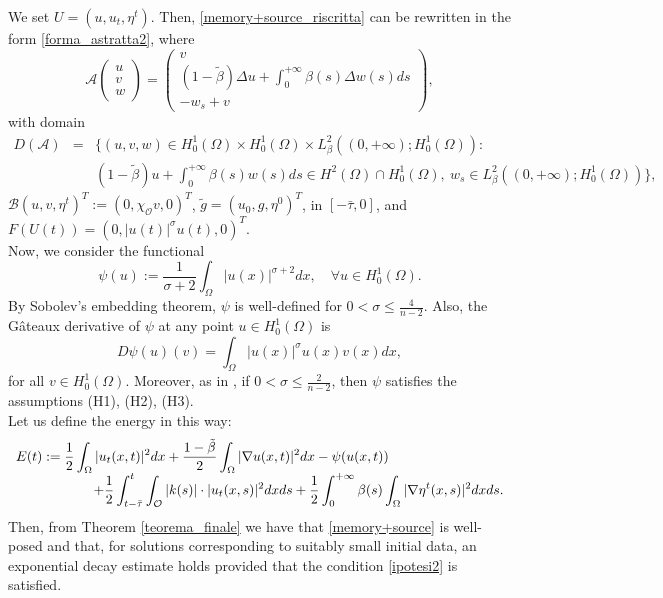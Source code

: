 \documentclass[11pt]{article}
\renewcommand{\leq}{\leqslant}
\renewcommand{\le}{\leqslant}
\begin{document}
We set $U=(u,u_t,\eta^t)$. Then, \eqref{memory+source_riscritta} can be rewritten in the form \eqref{forma_astratta2}, where
$$
\mathcal{A} \begin{pmatrix}
u\\
v\\
w
\end{pmatrix}
=
\begin{pmatrix}
v\\
(1-\tilde{\beta})\Delta u+\int_0^{+\infty} \beta(s) \Delta w(s) ds \\
-w_s +v
\end{pmatrix},
$$
with domain
\begin{eqnarray*}
{D(\mathcal{A})}&=&\{  (u,v,w)\in H_0^1(\Omega)\times H_0^1(\Omega)\times L^2_\beta ((0,+\infty);H^1_0(\Omega)): \\
& & (1-\tilde{\beta})u +\int_0^{+\infty} \beta(s)w(s)ds \in H^2(\Omega)\cap H_0^1(\Omega), \ w_s\in L^2_\beta ((0,+\infty);H^1_0(\Omega))\} ,
\end{eqnarray*}
$\mathcal{B}(u,v,\eta^t)^T := (0,\chi _{\mathcal{O}} v,0)^T$, $\tilde{g}=(u_0,g,\eta^0)^T$, in $[-\bar{\tau},0]$, and $F(U(t))=(0,|u(t)|^{\sigma}u(t), 0)^T$. 
\\Now, we consider the functional 
$$
\psi (u):= \frac{1}{\sigma +2} \int_{\Omega} |u(x)|^{\sigma+2} dx, \quad \forall u\in H^1_0(\Omega).
$$
By Sobolev's embedding theorem, $\psi$ is well-defined for $0<\sigma\leq\frac{4}{n-2}$. Also, the G\^ateaux derivative of $\psi$ at any point $u\in H_0^1(\Omega)$ is
$$
D\psi (u)(v)=\int_{\Omega} |u(x)|^\sigma u(x)v(x)dx,
$$
for all $v\in H_0^1(\Omega)$. Moreover, as in \cite{ACS}, if $0<\sigma\le \frac{2}{n-2}$, then $\psi$ satisfies the assumptions (H1), (H2), (H3). 
\\Let us define the energy in this way:
$$
\begin{array}{l}
\displaystyle{E(t):= \frac{1}{2}\int_{\Omega} |u_t(x,t)|^2 dx +\frac{1-\tilde{\beta}}{2}\int_{\Omega} |\nabla u(x,t)|^2 dx -\psi(u(x,t))}\\
\hspace{2 cm}
\displaystyle{ +\frac{1}{2}\int_{t-\bar\tau}^t \int_{\mathcal{O}} |k(s)|\cdot |u_t(x,s)|^2 dx ds +\frac{1}{2}\int_0^{+\infty} \beta (s)\int_{\Omega} |\nabla \eta^t(x,s)|^2 dx ds.}
\end{array}
$$
Then, from Theorem \ref{teorema_finale} we have that \eqref{memory+source} is well-posed and that, for solutions corresponding to suitably small initial data, an exponential decay estimate holds provided that the condition \eqref{ipotesi2} is satisfied.
\end{document}
